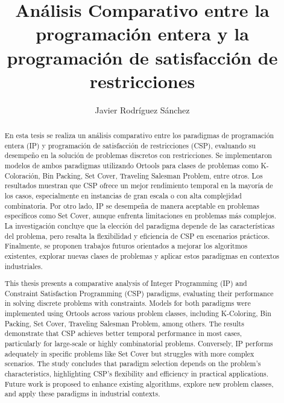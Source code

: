 \documentclass[12pt]{report}
\begin{document}
%
\title{Análisis Comparativo entre la programación entera y la programación de satisfacción de restricciones}

%
\author{Javier Rodríguez Sánchez}

\maketitle 

\begin{abstract}
En esta tesis se realiza un análisis comparativo entre los paradigmas de programación entera (IP) y programación de satisfacción de restricciones (CSP), evaluando su desempeño en la solución de problemas discretos con restricciones. Se implementaron modelos de ambos paradigmas utilizando Ortools para clases de problemas como K-Coloración, Bin Packing, Set Cover, Traveling Salesman Problem, entre otros. Los resultados muestran que CSP ofrece un mejor rendimiento temporal en la mayoría de los casos, especialmente en instancias de gran escala o con alta complejidad combinatoria. Por otro lado, IP se desempeña de manera aceptable en problemas específicos como Set Cover, aunque enfrenta limitaciones en problemas más complejos. La investigación concluye que la elección del paradigma depende de las características del problema, pero resalta la flexibilidad y eficiencia de CSP en escenarios prácticos. Finalmente, se proponen trabajos futuros orientados a mejorar los algoritmos existentes, explorar nuevas clases de problemas y aplicar estos paradigmas en contextos industriales.

\end{abstract}

\renewcommand{\abstractname}{Abstract}
\begin{abstract}
This thesis presents a comparative analysis of Integer Programming (IP) and Constraint Satisfaction Programming (CSP) paradigms, evaluating their performance in solving discrete problems with constraints. Models for both paradigms were implemented using Ortools across various problem classes, including K-Coloring, Bin Packing, Set Cover, Traveling Salesman Problem, among others. The results demonstrate that CSP achieves better temporal performance in most cases, particularly for large-scale or highly combinatorial problems. Conversely, IP performs adequately in specific problems like Set Cover but struggles with more complex scenarios. The study concludes that paradigm selection depends on the problem's characteristics, highlighting CSP's flexibility and efficiency in practical applications. Future work is proposed to enhance existing algorithms, explore new problem classes, and apply these paradigms in industrial contexts.

\end{abstract}
%
\end{document}
